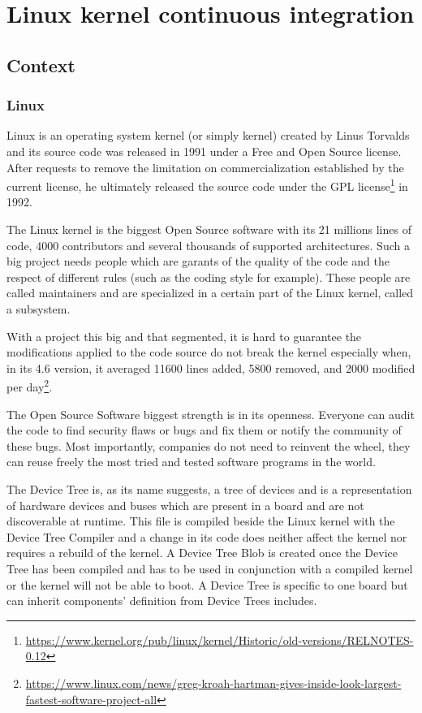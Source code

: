 \chapter{Linux kernel continuous integration}
\section{Context}
\subsection{Linux}
Linux is an operating system kernel (or simply kernel) created by Linus Torvalds and its source code was released in 1991 under a Free and Open Source license. After requests to remove the limitation on commercialization established by the current license, he ultimately released the source code under the GPL license\footnote{\url{https://www.kernel.org/pub/linux/kernel/Historic/old-versions/RELNOTES-0.12}} in 1992.

The Linux kernel is the biggest Open Source software with its 21 millions lines of code, 4000 contributors and several thousands of supported architectures. Such a big project needs people which are garants of the quality of the code and the respect of different rules (such as the coding style for example). These people are called maintainers and are specialized in a certain part of the Linux kernel, called a subsystem.

With a project this big and that segmented, it is hard to guarantee the modifications applied to the code source do not break the kernel especially when, in its 4.6 version, it averaged 11600 lines added, 5800 removed, and 2000 modified per day\footnote{\url{https://www.linux.com/news/greg-kroah-hartman-gives-inside-look-largest-fastest-software-project-all}}.

The Open Source Software biggest strength is in its openness. Everyone can audit the code to find security flaws or bugs and fix them or notify the community of these bugs. Most importantly, companies do not need to reinvent the wheel, they can reuse freely the most tried and tested software programs in the world.



The Device Tree is, as its name suggests, a tree of devices and is a representation of hardware devices and buses which are present in a board and are not discoverable at runtime. This file is compiled beside the Linux kernel with the Device Tree Compiler and a change in its code does neither affect the kernel nor requires a rebuild of the kernel. A Device Tree Blob is created once the Device Tree has been compiled and has to be used in conjunction with a compiled kernel or the kernel will not be able to boot. A Device Tree is specific to one board but can inherit components' definition from Device Trees includes.

